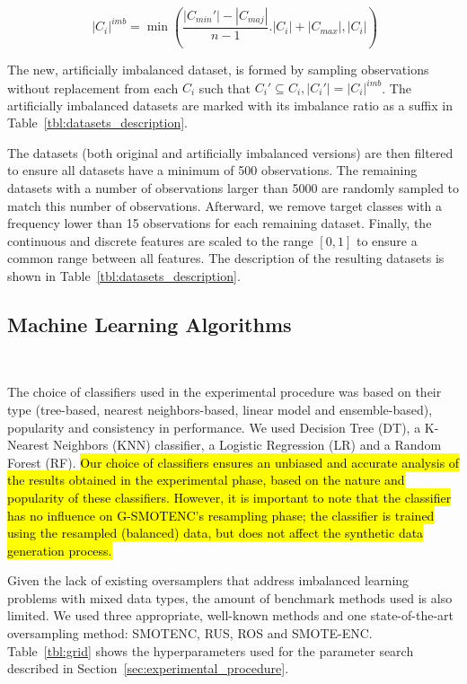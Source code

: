 \documentclass[preprint,12pt]{elsarticle}
\begin{document}
{\begin{equation}~\label{eq:sampling}
    |C_i|^{imb} =
    \min(\frac{|C_{min}'|-|C_{maj}|}{n-1}.|C_i|+|C_{max}|, |C_i|)
\end{equation}

The new, artificially imbalanced dataset, is formed by sampling observations
without replacement from each $C_i$ such that $C_i' \subseteq C_i , |C_i'| =
|C_i|^{imb}$. The artificially imbalanced datasets are marked with its
imbalance ratio as a suffix in Table~\ref{tbl:datasets_description}.

The datasets (both original and artificially imbalanced versions) are then
filtered to ensure all datasets have a minimum of 500 observations.  The
remaining datasets with a number of observations larger than 5000 are randomly
sampled to match this number of observations. Afterward, we remove target
classes with a frequency lower than 15 observations for each remaining
dataset. Finally, the continuous and discrete features are scaled to the range
$[0,1]$ to ensure a common range between all features. The description of the
resulting datasets is shown in Table~\ref{tbl:datasets_description}.




\subsection{Machine Learning Algorithms}~\label{sec:ml_algorithms}

The choice of classifiers used in the experimental procedure was based on
their type (tree-based, nearest neighbors-based, linear model and
ensemble-based), popularity and consistency in performance. We used Decision
Tree (DT), a K-Nearest Neighbors (KNN) classifier, a Logistic
Regression (LR) and a Random Forest (RF).\hl{ Our choice of classifiers
ensures an unbiased and accurate analysis of the results obtained in the
experimental phase, based on the nature and popularity of these classifiers.
However, it is important to note that the classifier has no influence on
G-SMOTENC's resampling phase; the classifier is trained using the resampled
(balanced) data, but does not affect the synthetic data generation process.}

Given the lack of existing oversamplers that address imbalanced learning
problems with mixed data types, the amount of benchmark methods used is also
limited. We used three appropriate, well-known methods and one state-of-the-art
oversampling method: SMOTENC, RUS, ROS and SMOTE-ENC\@. Table~\ref{tbl:grid}
shows the hyperparameters used for the parameter search described in
Section~\ref{sec:experimental_procedure}.

}
\end{document}
